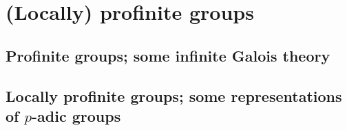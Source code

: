 \section{(Locally) profinite groups}
    \subsection{Profinite groups; some infinite Galois theory}

    \subsection{Locally profinite groups; some representations of \texorpdfstring{$p$}{}-adic groups}